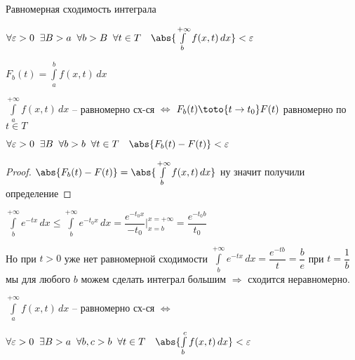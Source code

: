 
\begin{definition}
	Равномерная сходимость интеграла
	
	$\forall \varepsilon > 0 \;\; \exists B > a \;\; \forall b > B \;\; \forall t \in T \quad \abs{\int\limits_b^{+\infty} f(x, t)\, dx} < \varepsilon$
	
\end{definition}

\begin{remark}\thmslashn

    $F_b(t) = \int\limits_a^b f(x, t) \, dx$
	
	$\int\limits_a^{+\infty} f(x, t)\, dx$  -- равномерно сх-ся $\Leftrightarrow$ $F_b(t)  \toto{t\to t_0} F(t)$ равномерно по $t \in T$
	
	$\forall \varepsilon > 0\;\; \exists B \;\; \forall b > b \;\; \forall t\in T \quad \abs{F_b(t) - F(t)} < \varepsilon$
	
\end{remark}

\begin{proof}\thmslashn
	
	$\abs{F_b(t) - F(t)} = \abs{\int\limits_b^{+\infty} f(x, t)\, dx}$	ну значит получили определение

\end{proof}

\begin{example}\thmslashn
	
	$\int\limits_b^{+\infty} e^{-tx}\, dx \leqslant \int\limits_b^{+\infty} e^{-t_0x}\, dx  = \dfrac{e^{-t_0x}}{-t_0}\Big|_{x = b}^{x = +\infty} = \dfrac{e^{-t_0b}}{t_0}$

	Но при $t > 0$	уже нет равномерной сходимости $\int\limits_b^{+\infty} e^{-tx}\, dx = \dfrac{e^{-tb}}{t} = \dfrac{b}{e}$ при $t = \dfrac{1}{b}$ мы для любого $b$ можем сделать интеграл большим $\Rightarrow$ сходится неравномерно.
\end{example}

\begin{theorem}\thmslashn
	
	$\int\limits_a^{+\infty} f(x, t)\, dx$  -- равномерно сх-ся $\Leftrightarrow$ 
	
	$\forall \varepsilon > 0\;\; \exists B > a\;\; \forall b, c > b\;\; \forall t \in T \quad \abs{\int\limits_{b}^{c}f(x, t)\,dx} < \varepsilon$
	
\end{theorem}

